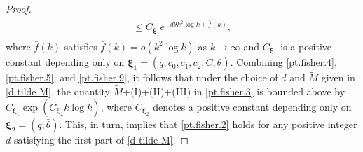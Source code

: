 \documentclass[ejsv2]{imsart}
\theoremstyle{plain}
\theoremstyle{definition}
\theoremstyle{remark}
\begin{document}
\begin{proof}
\begin{align}
\begin{split}
    \leq C_{\bm{\xi}_1}e^{-d\theta k^2\log k+\bar{f}(k)},
\end{split}
\end{align}
where $\bar{f}(k)$ satisfies
$\bar{f}(k)=o(k^2\log k)$ as $k\to\infty$ and $C_{\bm{\xi}_1}$ is a
 positive constant depending only on $\bm{\xi}_1=(q,c_0,c_1,c_2,\bar{C},\bar{\theta})$. Combining \eqref{pt.fisher.4}, \eqref{pt.fisher.5}, and \eqref{pt.fisher.9}, it follows that under the choice of $d$ and $\tilde{M}$ given in \eqref{d tilde M}, the quantity $\tilde{M}$+(I)+(II)+(III) in \eqref{pt.fisher.3} is bounded above by $C_{\bm{\xi}_1}\exp({C_{\bm{\xi}_2}k\log k})$, where $C_{\bm{\xi}_2}$
denotes a positive constant depending only on $\bm{\xi}_2=(q,\bar{\theta})$.
This, in turn, implies that \eqref{pt.fisher.2} holds for any positive integer $d$ satisfying the first part of \eqref{d tilde M}.
\end{proof}
\end{document}
